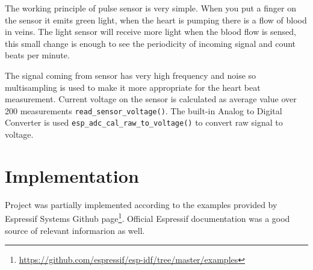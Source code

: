\documentclass[a4paper, 11pt, twocolumn]{article}
\begin{document}
The working principle of pulse sensor is very simple. When you put a finger on the sensor it emits green light,
when the heart is pumping there is a flow of blood in veins. The light sensor will receive more light when the blood flow is sensed, this small change is enough to see the periodicity of incoming signal and count beats per minute.\par
The signal coming from sensor has very high frequency and noise so multisampling is used to make it more appropriate for the heart beat measurement. Current voltage on the sensor is calculated as average value over 200 measurements \texttt{read\_sensor\_voltage()}. The built-in Analog to Digital Converter is used \texttt{esp\_adc\_cal\_raw\_to\_voltage()} to convert raw signal to voltage.


\section {Implementation}
Project was partially implemented according to the examples provided by Espressif Systems Github page\footnote{\url{https://github.com/espressif/esp-idf/tree/master/examples}}. Official Espressif documentation was a good source of relevant informarion as well\cite{esp-doc}.
\end{document}
